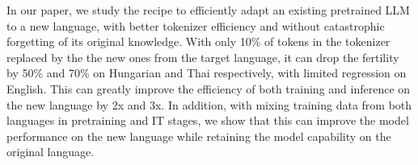 


In our paper, we study the recipe to efficiently adapt an existing pretrained LLM to a new language, with better tokenizer efficiency and without catastrophic forgetting of its original knowledge.
With only 10\% of tokens in the tokenizer replaced by the the new ones from the target language, it can drop the fertility by 50\% and 70\% on Hungarian and Thai respectively, with limited regression on English. This can greatly improve the efficiency of both training and inference on the new language by 2x and 3x.
In addition, with mixing training data from both languages in pretraining and IT stages, we show that this can improve the model performance on the new language while retaining the model capability on the original language.